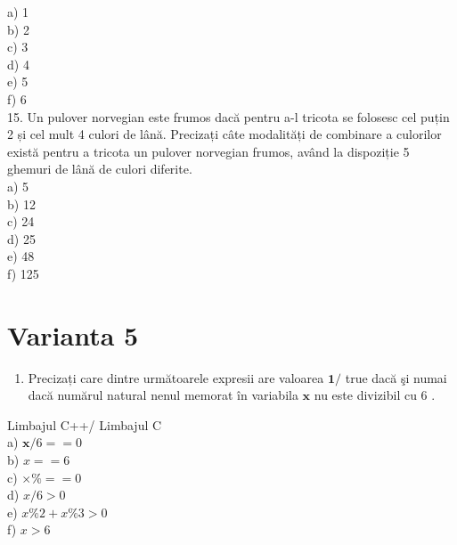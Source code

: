 a) 1\\
b) 2\\
c) 3\\
d) 4\\
e) 5\\
f) 6\\
15. Un pulover norvegian este frumos dacă pentru a-l tricota se folosesc cel puțin 2 și cel mult 4 culori de lână. Precizați câte modalități de combinare a culorilor există pentru a tricota un pulover norvegian frumos, având la dispoziție 5 ghemuri de lână de culori diferite.\\
a) 5\\
b) 12\\
c) 24\\
d) 25\\
e) 48\\
f) 125

\section*{Varianta 5}
\begin{enumerate}
  \item Precizați care dintre următoarele expresii are valoarea $\mathbf{1} /$ true dacă şi numai dacă numărul natural nenul memorat în variabila $\mathbf{x}$ nu este divizibil cu 6 .
\end{enumerate}

Limbajul C++/ Limbajul C\\
a) $\mathbf{x} / 6==0$\\
b) $x==6$\\
c) $\times \%==0$\\
d) $x / 6>0$\\
e) $x \% 2+x \% 3>0$\\
f) $x>6$

